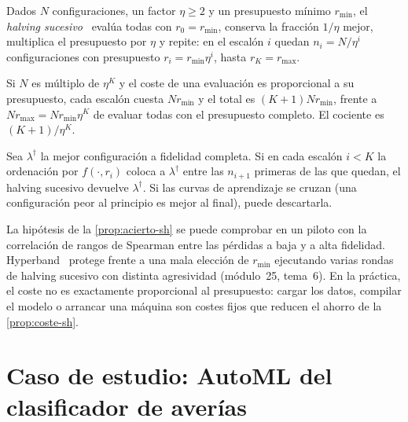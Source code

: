 \begin{definicion}\label{def:sh}
Dados $N$ configuraciones, un factor $\eta\ge2$ y un presupuesto mínimo $r_{\min}$, el \emph{halving sucesivo}~\cite{sh} evalúa todas con $r_0=r_{\min}$, conserva la fracción $1/\eta$ mejor, multiplica el presupuesto por $\eta$ y repite: en el escalón $i$ quedan $n_i=N/\eta^{i}$ configuraciones con presupuesto $r_i=r_{\min}\eta^{i}$, hasta $r_K=r_{\max}$.
\end{definicion}

\begin{proposicion}\label{prop:coste-sh}
Si $N$ es múltiplo de $\eta^{K}$ y el coste de una evaluación es proporcional a su presupuesto, cada escalón cuesta $N r_{\min}$ y el total es $(K+1)Nr_{\min}$, frente a $Nr_{\max}=N r_{\min}\eta^{K}$ de evaluar todas con el presupuesto completo. El cociente es $(K+1)/\eta^{K}$.
\end{proposicion}

\begin{proposicion}\label{prop:acierto-sh}
Sea $\lambda^{\dagger}$ la mejor configuración a fidelidad completa. Si en cada escalón $i<K$ la ordenación por $f(\cdot,r_i)$ coloca a $\lambda^{\dagger}$ entre las $n_{i+1}$ primeras de las que quedan, el halving sucesivo devuelve $\lambda^{\dagger}$. Si las curvas de aprendizaje se cruzan (una configuración peor al principio es mejor al final), puede descartarla.
\end{proposicion}

La hipótesis de la \cref{prop:acierto-sh} se puede comprobar en un piloto con la correlación de rangos de Spearman entre las pérdidas a baja y a alta fidelidad. Hyperband~\cite{hyperband} protege frente a una mala elección de $r_{\min}$ ejecutando varias rondas de halving sucesivo con distinta agresividad (módulo~25, tema~6). En la práctica, el coste no es exactamente proporcional al presupuesto: cargar los datos, compilar el modelo o arrancar una máquina son costes fijos que reducen el ahorro de la \cref{prop:coste-sh}.

\section{Caso de estudio: AutoML del clasificador de averías}

\addtocounter{definicion}{1}%

